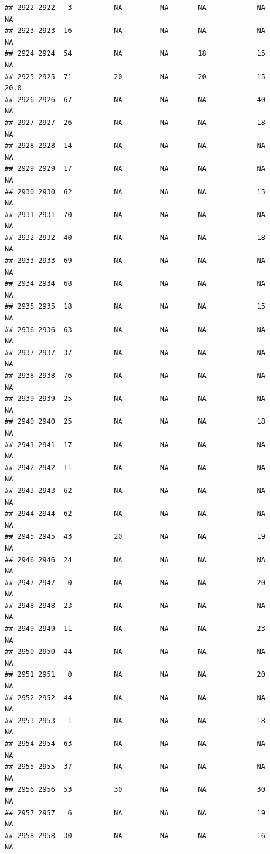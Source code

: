 \documentclass[man]{apa6}
\begin{document}
\begin{verbatim}
## 2922 2922   3          NA         NA       NA            NA       NA
## 2923 2923  16          NA         NA       NA            NA       NA
## 2924 2924  54          NA         NA       18            15       NA
## 2925 2925  71          20         NA       20            15     20.0
## 2926 2926  67          NA         NA       NA            40       NA
## 2927 2927  26          NA         NA       NA            18       NA
## 2928 2928  14          NA         NA       NA            NA       NA
## 2929 2929  17          NA         NA       NA            NA       NA
## 2930 2930  62          NA         NA       NA            15       NA
## 2931 2931  70          NA         NA       NA            NA       NA
## 2932 2932  40          NA         NA       NA            18       NA
## 2933 2933  69          NA         NA       NA            NA       NA
## 2934 2934  68          NA         NA       NA            NA       NA
## 2935 2935  18          NA         NA       NA            15       NA
## 2936 2936  63          NA         NA       NA            NA       NA
## 2937 2937  37          NA         NA       NA            NA       NA
## 2938 2938  76          NA         NA       NA            NA       NA
## 2939 2939  25          NA         NA       NA            NA       NA
## 2940 2940  25          NA         NA       NA            18       NA
## 2941 2941  17          NA         NA       NA            NA       NA
## 2942 2942  11          NA         NA       NA            NA       NA
## 2943 2943  62          NA         NA       NA            NA       NA
## 2944 2944  62          NA         NA       NA            NA       NA
## 2945 2945  43          20         NA       NA            19       NA
## 2946 2946  24          NA         NA       NA            NA       NA
## 2947 2947   0          NA         NA       NA            20       NA
## 2948 2948  23          NA         NA       NA            NA       NA
## 2949 2949  11          NA         NA       NA            23       NA
## 2950 2950  44          NA         NA       NA            NA       NA
## 2951 2951   0          NA         NA       NA            20       NA
## 2952 2952  44          NA         NA       NA            NA       NA
## 2953 2953   1          NA         NA       NA            18       NA
## 2954 2954  63          NA         NA       NA            NA       NA
## 2955 2955  37          NA         NA       NA            NA       NA
## 2956 2956  53          30         NA       NA            30       NA
## 2957 2957   6          NA         NA       NA            19       NA
## 2958 2958  30          NA         NA       NA            16       NA

\end{verbatim}
\end{document}
